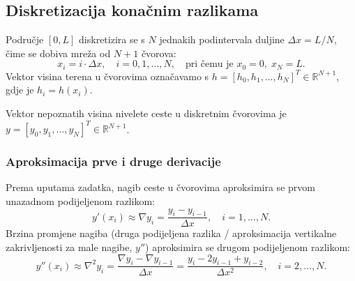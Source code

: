 \subsection{Diskretizacija konačnim razlikama}

Područje $[0, L]$ diskretizira se s $N$ jednakih podintervala duljine $\Delta x = L/N$, čime se dobiva mreža od $N+1$ čvorova:
\begin{equation}
x_i = i \cdot \Delta x, \quad i = 0, 1, \dots, N, \quad \text{pri čemu je } x_0 = 0, \; x_N = L.
\end{equation}
Vektor visina terena u čvorovima označavamo s $h = [h_0, h_1, \dots, h_N]^T \in \mathbb{R}^{N+1}$, gdje je $h_i = h(x_i)$.

Vektor nepoznatih visina nivelete ceste u diskretnim čvorovima je $y = [y_0, y_1, \dots, y_N]^T \in \mathbb{R}^{N+1}$.

\subsubsection{Aproksimacija prve i druge derivacije}

Prema uputama zadatka, nagib ceste u čvorovima aproksimira se prvom unazadnom podijeljenom razlikom:
\begin{equation}
y'(x_i) \approx \nabla y_i = \frac{y_i - y_{i-1}}{\Delta x}, \quad i = 1, \dots, N.
\label{eq:diff_first}
\end{equation}
Brzina promjene nagiba (druga podijeljena razlika / aproksimacija vertikalne zakrivljenosti za male nagibe, $y''$) aproksimira se drugom podijeljenom razlikom:
\begin{equation}
y''(x_i) \approx \nabla^2 y_i = \frac{\nabla y_i - \nabla y_{i-1}}{\Delta x} = \frac{y_i - 2y_{i-1} + y_{i-2}}{\Delta x^2}, \quad i = 2, \dots, N.
\label{eq:diff_second}
\end{equation}

